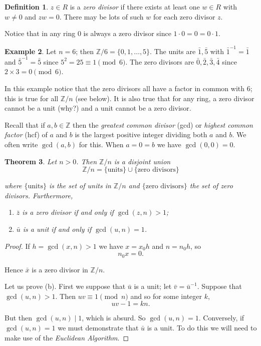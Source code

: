 \documentclass[11pt]{book}
\theoremstyle{plain}
\newtheorem{theorem}{Theorem}[chapter]
\theoremstyle{definition}
\newtheorem{definition}[theorem]{Definition}
\newtheorem{example}[theorem]{Example}
\begin{document}
\begin{definition}
$z \in R$ is a \emph{zero divisor} if there exists at least one $w \in R$ with $w \neq 0$ and $zw = 0$. There may be lots of such $w$ for each zero divisor $z$.
\end{definition}

Notice that in any ring $0$ is always a zero divisor since $1 \cdot 0 = 0 = 0 \cdot 1$.

\begin{example}
Let $n = 6$; then $\mathbb{Z}/6 = \{0, 1, \ldots, 5\}$. The units are $\bar{1}, \bar{5}$ with $\bar{1}^{-1} = \bar{1}$ and $\bar{5}^{-1} = \bar{5}$ since $5^2 = 25 \equiv 1 \pmod{6}$. The zero divisors are $\bar{0}, \bar{2}, \bar{3}, \bar{4}$ since $2 \times 3 = 0 \pmod{6}$.
\end{example}

In this example notice that the zero divisors all have a factor in common with $6$; this is true for all $\mathbb{Z}/n$ (see below). It is also true that for any ring, a zero divisor cannot be a unit (why?) and a unit cannot be a zero divisor.

Recall that if $a, b \in \mathbb{Z}$ then the \emph{greatest common divisor} (gcd) or \emph{highest common factor} (hcf) of $a$ and $b$ is the largest positive integer dividing both $a$ and $b$. We often write $\gcd(a,b)$ for this. When $a = 0 = b$ we have $\gcd(0,0) = 0$.

\begin{theorem}
Let $n > 0$. Then $\mathbb{Z}/n$ is a disjoint union
\[
\mathbb{Z}/n = \{\text{units}\} \cup \{\text{zero divisors}\}
\]

where $\{\text{units}\}$ is the set of units in $\mathbb{Z}/n$ and $\{\text{zero divisors}\}$ the set of zero divisors. Furthermore,
\begin{enumerate}
    \item[(a)] $\bar{z}$ is a zero divisor if and only if $\gcd(z, n) > 1$;
    \item[(b)] $\bar{u}$ is a unit if and only if $\gcd(u, n) = 1$.
\end{enumerate}
\end{theorem}

\begin{proof}
If $h = \gcd(x, n) > 1$ we have $x = x_0 h$ and $n = n_0 h$, so
\[
n_0 x = 0.
\]

Hence $\bar{x}$ is a zero divisor in $\mathbb{Z}/n$.

Let us prove (b). First we suppose that $\bar{u}$ is a unit; let $\bar{v} = \bar{u}^{-1}$. Suppose that $\gcd(u, n) > 1$. Then $uv \equiv 1 \pmod{n}$ and so for some integer $k$,
\[
uv - 1 = kn.
\]

But then $\gcd(u, n) \mid 1$, which is absurd. So $\gcd(u, n) = 1$. Conversely, if $\gcd(u, n) = 1$ we must demonstrate that $\bar{u}$ is a unit. To do this we will need to make use of the \emph{Euclidean Algorithm}.
\end{proof}
\end{document}
